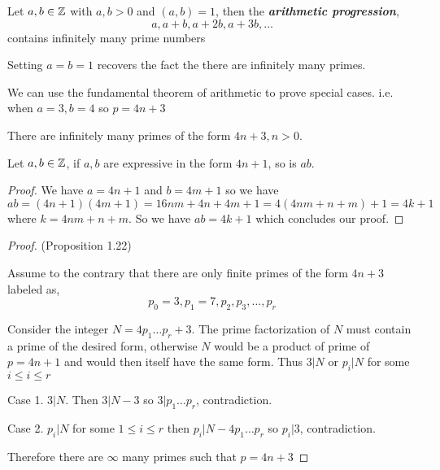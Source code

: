 \setcounter{theorem}{20}
\begin{theorem}
    Let $a, b \in \mathbb{Z}$ with  $a, b > 0$ and $(a,b) = 1$, then the \textbf{\emph{arithmetic progression}},
    $$a, a + b, a + 2b, a + 3b, \dots$$ 
    contains infinitely many prime numbers 
\end{theorem}
\begin{remark}
    Setting $a = b = 1$ recovers the fact the there are infinitely many primes.
\end{remark}
\begin{remark}
    We can use the fundamental theorem of arithmetic to prove special cases. i.e. when $a = 3, b = 4$ so $p = 4n + 3$
\end{remark}

\begin{prop}
    There are infinitely many primes of the form $4n + 3, n > 0$.
\end{prop}
\begin{lemma}
    Let $a, b \in \mathbb{Z}$, if  $a, b$ are expressive in the form  $4n + 1$, so is $ab$.
\end{lemma}

\begin{proof}
    We have $a = 4n + 1$ and $b = 4m + 1$ so we have $ab = (4n + 1)(4m + 1) = 16nm + 4n + 4m + 1 = 4(4nm + n + m) + 1 = 4k + 1$ where $k = 4nm + n + m$. So we have  $ab = 4k + 1$ which concludes our proof.
\end{proof}


\begin{proof}
(Proposition 1.22)


Assume to the contrary that there are only finite primes of the form $4n + 3$ labeled as,  
$$ p_0 = 3, p_1 = 7, p_2, p_3, \dots, p_r $$ 

Consider the integer $N = 4p_1 \dots p_r + 3$. The prime factorization of $N$ must contain a prime of the desired form, otherwise $N$ would be a product of prime of $p = 4n + 1$ and would then itself have the same form. Thus $3 | N$ or $p_i | N$ for some $i \le i \le r$

Case 1. $3 | N$. Then $3 | N - 3$ so  $3 | p_1\dots p_r$, contradiction.

Case 2. $p_i | N$ for some  $1 \le i \le r$ then $p_i | N - 4p_1\dots p_r$ so $p_i | 3$, contradiction.

Therefore there are $\infty$ many primes such that $p = 4n + 3$
\end{proof}





